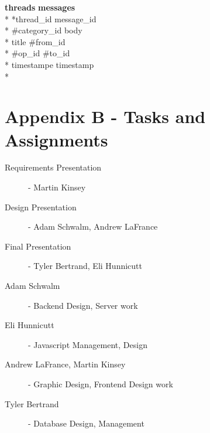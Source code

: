 \documentclass[12pt]{scrartcl}
\begin{document}
\textbf{threads} \hfill \textbf{messages}\\*
*thread\_id \hfill *message\_id\\*
\#category\_id \hfill body\\*
title \hfill \#from\_id\\*
\#op\_id \hfill \#to\_id\\*
timestampe \hfill timestamp\\*

\section{Appendix B - Tasks and Assignments}
\begin{description}
\item [Requirements Presentation] - Martin Kinsey
\item [Design Presentation] - Adam Schwalm, Andrew LaFrance
\item [Final Presentation] - Tyler Bertrand, Eli Hunnicutt
\vspace{4mm}
\item [Adam Schwalm] - Backend Design, Server work
\item [Eli Hunnicutt] - Javascript Management, Design
\item [Andrew LaFrance, Martin Kinsey] - Graphic Design, Frontend Design work
\item [Tyler Bertrand] - Database Design, Management
\end{description}
\end{document}
